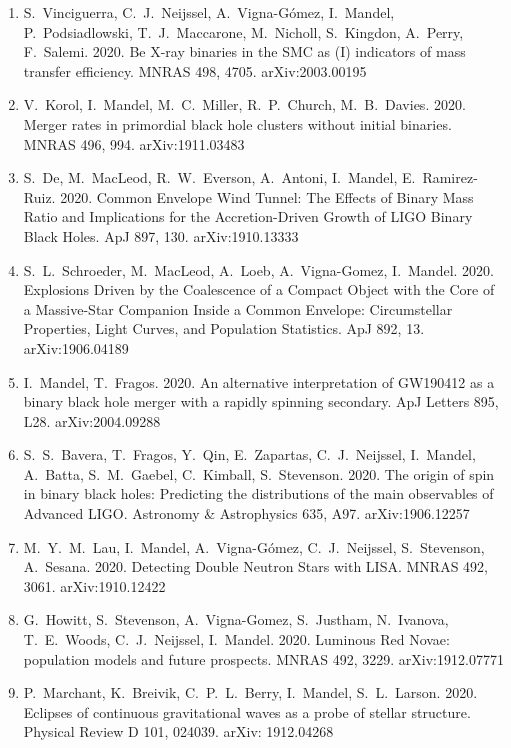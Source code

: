 \documentclass[margin,line]{res}
\begin{document}
\begin{resume}
\begin{enumerate}
\item S.~Vinciguerra, C.~J.~Neijssel, A.~Vigna-G\'{o}mez, I.~Mandel, P.~Podsiadlowski, T.~J.~Maccarone, M.~Nicholl, S.~Kingdon, A.~Perry, F.~Salemi.  2020. Be X-ray binaries in the SMC as (I) indicators of mass transfer efficiency.  MNRAS 498, 4705.  arXiv:2003.00195

\item V.~Korol, I.~Mandel, M.~C.~Miller, R.~P.~Church, M.~B.~Davies. 2020. Merger rates in primordial black hole clusters without initial binaries. MNRAS 496, 994.  arXiv:1911.03483

\item S.~De, M.~MacLeod, R.~W.~Everson, A.~Antoni, I.~Mandel, E.~Ramirez-Ruiz.  2020.  Common Envelope Wind Tunnel: The Effects of Binary Mass Ratio and Implications for the Accretion-Driven Growth of LIGO Binary Black Holes.  ApJ 897, 130.  arXiv:1910.13333

\item S.~L.~Schroeder, M.~MacLeod, A.~Loeb, A.~Vigna-Gomez, I.~Mandel.  2020. Explosions Driven by the Coalescence of a Compact Object with the Core of a Massive-Star Companion Inside a Common Envelope: Circumstellar Properties, Light Curves, and Population Statistics.  ApJ 892, 13.  arXiv:1906.04189

\item I.~Mandel, T.~Fragos. 2020. An alternative interpretation of GW190412 as a binary black hole merger with a rapidly spinning secondary.  ApJ Letters 895, L28. arXiv:2004.09288

\item S.~S.~Bavera, T.~Fragos, Y.~Qin, E.~Zapartas, C.~J.~Neijssel, I.~Mandel, A.~Batta, S.~M.~Gaebel, C.~Kimball, S.~Stevenson.  2020.  The origin of spin in binary black holes: Predicting the distributions of the main observables of Advanced LIGO.  Astronomy \& Astrophysics 635, A97.  arXiv:1906.12257

\item M.~Y.~M.~Lau, I.~Mandel, A.~Vigna-G\'{o}mez, C.~J.~Neijssel, S.~Stevenson, A.~Sesana.  2020.  Detecting Double Neutron Stars with LISA.  MNRAS 492, 3061.  arXiv:1910.12422

\item G.~Howitt, S.~Stevenson, A.~Vigna-Gomez, S.~Justham, N.~Ivanova, T.~E.~Woods, C.~J.~Neijssel, I.~Mandel.  2020.  Luminous Red Novae: population models and future prospects.  MNRAS 492, 3229.  arXiv:1912.07771 

\item P.~Marchant, K.~Breivik, C.~P.~L.~Berry, I.~Mandel, S.~L.~Larson. 2020.  Eclipses of continuous gravitational waves as a probe of stellar structure.  Physical Review D 101, 024039.
arXiv: 1912.04268


\end{enumerate}
\end{resume}
\end{document}
